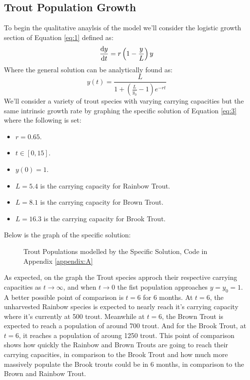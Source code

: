 \documentclass[letterpaper,12pt]{article}
\begin{document}
\subsection{Trout Population Growth}
To begin the qualitative anaylsis of the model we'll consider the logistic growth section of Equation \eqref{eq:1} defined as:
\begin{equation*}
    \dv{y}{t} = r\left(1 - \frac{y}{L}\right)y
\end{equation*}
Where the general solution can be analytically found as:
\begin{equation} \label{eq:3}
    y(t) = \frac{L}{1 + \left(\frac{L}{y_0} - 1\right)e^{-rt}}
\end{equation}
We'll consider a variety of trout species with varying carrying capacities but the same intrinsic growth rate by graphing the specific solution of Equation \eqref{eq:3} where the following is set:
\begin{itemize}
    \item \(r = 0.65\).
    \item \(t \in [0,15]\).
    \item \(y(0) = 1\).
    \item \(L = 5.4\) is the carrying capacity for Rainbow Trout.
    \item \(L = 8.1\) is the carrying capacity for Brown Trout.
    \item \(L = 16.3\) is the carrying capacity for Brook Trout.
\end{itemize}
Below is the graph of the specific solution:
\newline
\begin{figure}[H]
    \centering
    
    \caption{Trout Populations modelled by the Specific Solution, Code in Appendix \ref{appendix:A}}
    \label{fig:1}
\end{figure}
\noindent As expected, on the graph the Trout species approch their respective carrying capacities as \(t \to \infty\), and when \(t \to 0\) the fist population approaches \(y = y_0 = 1\).
A better possible point of comparison is \(t = 6\) for 6 months.
At \(t = 6\), the unharvested Rainbow species is expected to nearly reach it's carrying capacity where it's currently at 500 trout.
Meanwhile at \(t = 6\), the Brown Trout is expected to reach a population of around 700 trout.
And for the Brook Trout, at \(t = 6\), it reaches a population of aroung 1250 trout.
This point of comparison shows how quickly the Rainbow and Brown Trouts are going to reach their carrying capacities, in comparison to the Brook Trout and how much more massively populate the Brook trouts could be in 6 months, in comparison to the Brown and Rainbow Trout.
\end{document}

